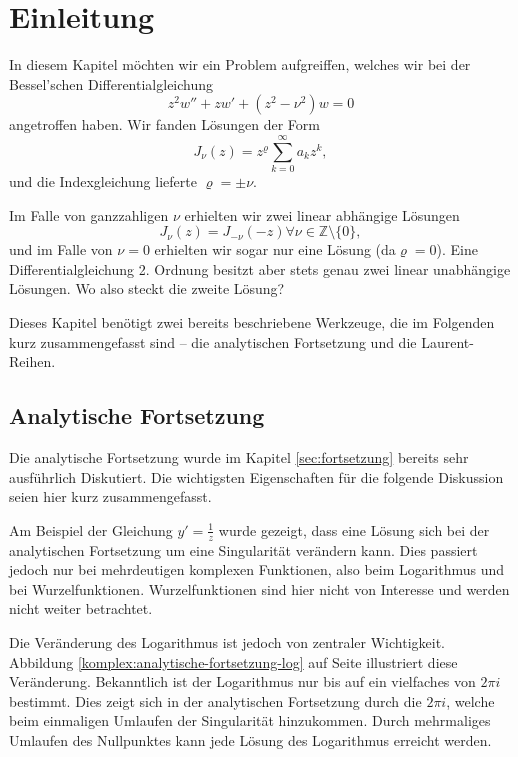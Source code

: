 \section{Einleitung}

In diesem Kapitel möchten wir ein Problem aufgreiffen, welches wir bei der Bessel'schen Differentialgleichung
$$ z^2w''+zw'+(z^2 - \nu^2)w=0$$
angetroffen haben. Wir fanden Lösungen der Form 
$$J_\nu(z)=z^\varrho\sum_{k=0}^{\infty}a_kz^k,$$
und die Indexgleichung lieferte $\varrho=\pm\nu.$

\begin{problem*} Im Falle von ganzzahligen $\nu$ erhielten wir zwei linear abhängige Lösungen $$J_\nu(z) = J_{-\nu}(-z)\forall\nu\in\mathbb{Z}\setminus\{0\},$$
und im Falle von $\nu=0$ erhielten wir sogar nur eine Lösung (da$\varrho=0$). Eine Differentialgleichung 2. Ordnung besitzt aber stets genau zwei linear unabhängige Lösungen. Wo also steckt die zweite Lösung?
\end{problem*}

Dieses Kapitel benötigt zwei bereits beschriebene Werkzeuge, die im Folgenden kurz zusammengefasst sind -- die analytischen Fortsetzung und die Laurent-Reihen.

\subsection{Analytische Fortsetzung}
Die analytische Fortsetzung wurde im Kapitel \ref{sec:fortsetzung} bereits sehr ausführlich Diskutiert. Die wichtigsten Eigenschaften für die folgende Diskussion seien hier kurz zusammengefasst.

Am Beispiel der Gleichung $y'=\frac{1}{z}$ wurde gezeigt, dass eine Lösung sich bei der analytischen Fortsetzung um eine Singularität verändern kann. Dies passiert jedoch nur bei mehrdeutigen komplexen Funktionen, also beim Logarithmus und bei Wurzelfunktionen. Wurzelfunktionen sind hier nicht von Interesse und werden nicht weiter betrachtet. 

Die Veränderung des Logarithmus ist jedoch von zentraler Wichtigkeit. Abbildung \ref{komplex:analytische-fortsetzung-log} auf Seite \pageref{komplex:analytische-fortsetzung-log} illustriert diese Veränderung. Bekanntlich ist der Logarithmus nur bis auf ein vielfaches von $2\pi i$ bestimmt. Dies zeigt sich in der analytischen Fortsetzung durch die $2\pi i$, welche beim einmaligen Umlaufen der Singularität hinzukommen. Durch mehrmaliges Umlaufen des Nullpunktes kann jede Lösung des Logarithmus erreicht werden.

